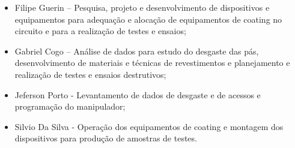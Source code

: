 \begin{itemize}
  \item Filipe Guerin – Pesquisa, projeto e desenvolvimento de dispositivos e
  equipamentos para adequação e alocação de equipamentos de coating no circuito
  e para a realização de testes e ensaios;
  \item Gabriel Cogo – Análise de dados para estudo do desgaste das pás,
  desenvolvimento de materiais e técnicas de revestimentos e planejamento e
  realização de testes e ensaios destrutivos;
  \item Jeferson Porto - Levantamento de dados de desgaste e de acessos e
  programação do manipulador;
  \item Silvio Da Silva - Operação dos equipamentos de coating e montagem dos
  dispositivos para produção de amostras de testes.
\end{itemize}


















    
    
  
